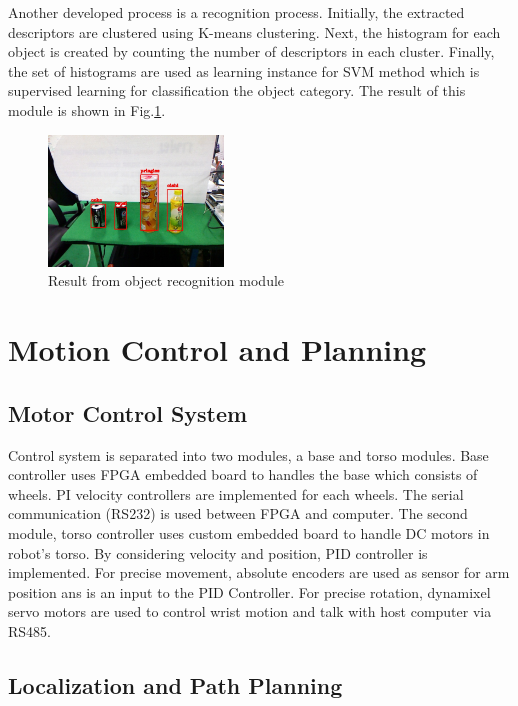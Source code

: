 \documentclass{llncs}
\begin{document}
Another developed process is a recognition process. Initially, the extracted descriptors are clustered using K-means clustering. Next, the histogram for each object is created by counting the number of descriptors in each cluster. Finally, the set of histograms are used as learning instance for SVM method which is supervised learning for classification the object category\cite{obj_rec}. The result of this module is shown in Fig.\ref{fig:object_recog}.

\begin{figure}
\centering
\includegraphics[height=3.5cm]{object_recognition_figure}
\caption{Result from object recognition module}
\label{fig:object_recog}
\end{figure}

\section{Motion Control and Planning}

\subsection{Motor Control System}

Control system is separated into two modules, a base and torso modules. Base controller uses FPGA embedded board to handles the base which consists of wheels. PI velocity controllers are implemented for each wheels. The serial communication (RS232) is used between FPGA and computer. The second module, torso controller uses custom embedded board to handle DC motors in robot's torso. By considering velocity and position, PID controller is implemented. For precise movement, absolute encoders are used as sensor for arm position ans is an input to the PID Controller. For precise rotation, dynamixel servo motors are used to control wrist motion and talk with host computer via RS485.

\subsection{Localization and Path Planning}
\end{document}
